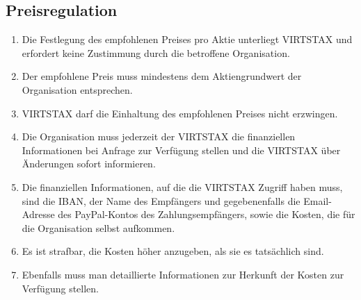\documentclass{article}
\begin{document}
\subsection{Preisregulation}
\begin{enumerate}[(1)]
    \item Die Festlegung des empfohlenen Preises pro Aktie unterliegt VIRTSTAX und erfordert keine Zustimmung durch die betroffene Organisation.
    \item Der empfohlene Preis muss mindestens dem Aktiengrundwert der Organisation entsprechen.
    \item VIRTSTAX darf die Einhaltung des empfohlenen Preises nicht erzwingen.
    \item Die Organisation muss jederzeit der VIRTSTAX die finanziellen Informationen bei Anfrage zur Verfügung stellen und die VIRTSTAX über Änderungen sofort informieren.
    \item Die finanziellen Informationen, auf die die VIRTSTAX Zugriff haben muss, sind die IBAN, der Name des Empfängers und gegebenenfalls die Email-Adresse des PayPal-Kontos des Zahlungsempfängers, sowie die Kosten, die für die Organisation selbst aufkommen.
    \item Es ist strafbar, die Kosten höher anzugeben, als sie es tatsächlich sind.
    \item Ebenfalls muss man detaillierte Informationen zur Herkunft der Kosten zur Verfügung stellen.
\end{enumerate}
\end{document}
